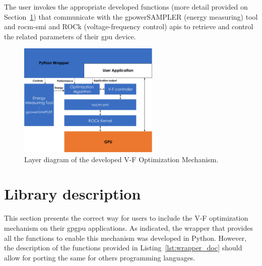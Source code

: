 The user invokes the appropriate developed functions (more detail provided on Section~\ref{sec:usage}) that communicate with the gpowerSAMPLER (energy measuring) tool and rocm-smi and ROCk (voltage-frequency control) \acrshort{api}s to retrieve and control the related parameters of their \acrshort{gpu} device. 

\begin{figure}[htb]
  \centering
  \includegraphics[width=0.6\textwidth]{Figures/Optimization/layerDiagram.pdf}
  \caption{Layer diagram of the developed V-F Optimization Mechanism.}
  \label{fig:layer}
\end{figure}


\section{Library description}
\label{sec:usage}

This section presents the correct way for users to include the V-F optimization mechanism on their \acrshort{gpgpu} applications. As indicated, the wrapper that provides all the functions to enable this mechanism was developed in Python. However, the description of the functions provided in Listing~\ref{lst:wrapper_doc} should allow for porting the same for others programming languages. 


